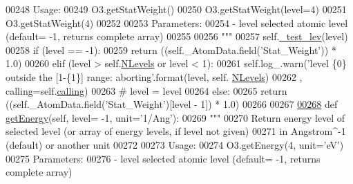 \begin{DoxyCode}
00248 \textcolor{stringliteral}{        Usage:}
00249 \textcolor{stringliteral}{            O3.getStatWeight()}
00250 \textcolor{stringliteral}{            O3.getStatWeight(level=4)}
00251 \textcolor{stringliteral}{            O3.getStatWeight(4)}
00252 \textcolor{stringliteral}{                      }
00253 \textcolor{stringliteral}{        Parameters:}
00254 \textcolor{stringliteral}{            - level  selected atomic level (default= -1, returns complete array)}
00255 \textcolor{stringliteral}{            }
00256 \textcolor{stringliteral}{        """}
00257         self.\hyperlink{classpyneb_1_1core_1_1pynebcore_1_1___atom_data_fits_ae83c63a7bd651275de23e5f17ddcf999}{\_test\_lev}(level)
00258         \textcolor{keywordflow}{if} (level == -1):
00259             \textcolor{keywordflow}{return} ((self.\_AtomData.field(\textcolor{stringliteral}{'Stat\_Weight'})) * 1.0)
00260         \textcolor{keywordflow}{elif} (level > self.\hyperlink{classpyneb_1_1core_1_1pynebcore_1_1___atom_data_fits_a85c3a2d0c1cdbecc851be17237caff63}{NLevels}  \textcolor{keywordflow}{or} level < 1):
00261             self.log\_.warn(\textcolor{stringliteral}{'level \{0\} outside the [1-\{1\}] range: aborting'}.format(level, self.
      \hyperlink{classpyneb_1_1core_1_1pynebcore_1_1___atom_data_fits_a85c3a2d0c1cdbecc851be17237caff63}{NLevels})
00262                                , calling=self.\hyperlink{classpyneb_1_1core_1_1pynebcore_1_1___atom_data_fits_a70465eedf1ac0b8e43360bc423be9c93}{calling})
00263 \textcolor{comment}{#                level = level %
00264         \textcolor{keywordflow}{else}:
00265             \textcolor{keywordflow}{return} ((self.\_AtomData.field(\textcolor{stringliteral}{'Stat\_Weight'})[level - 1]) * 1.0)
00266     
00267 
\hypertarget{pynebcore_8py_source_l00268}{}\hyperlink{classpyneb_1_1core_1_1pynebcore_1_1___atom_data_fits_ade643ddf8307c8068ad52b9500d894ce}{00268}     \textcolor{keyword}{def }\hyperlink{classpyneb_1_1core_1_1pynebcore_1_1___atom_data_fits_ade643ddf8307c8068ad52b9500d894ce}{getEnergy}(self, level= -1, unit='1/Ang'):
00269         \textcolor{stringliteral}{"""}
00270 \textcolor{stringliteral}{        Return energy level of selected level (or array of energy levels, if level not given) }
00271 \textcolor{stringliteral}{            in Angstrom^-1 (default) or another unit}
00272 \textcolor{stringliteral}{        }
00273 \textcolor{stringliteral}{        Usage:}
00274 \textcolor{stringliteral}{            O3.getEnergy(4, unit='eV')}
00275 \textcolor{stringliteral}{        Parameters:}
00276 \textcolor{stringliteral}{            - level  selected atomic level (default= -1, returns complete array)}
}
\end{DoxyCode}
